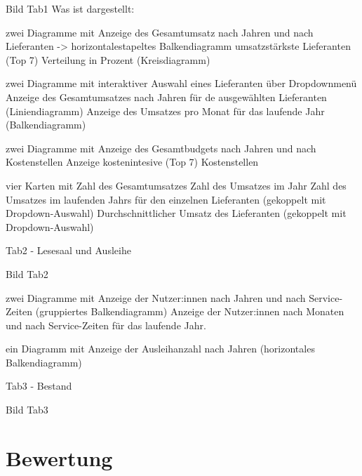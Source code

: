     Bild Tab1
    Was ist dargestellt:
    
    zwei Diagramme mit 
        Anzeige des Gesamtumsatz nach Jahren und nach Lieferanten ->  horizontalestapeltes Balkendiagramm
        umsatzstärkste Lieferanten (Top 7) Verteilung in Prozent (Kreisdiagramm)
        
    zwei Diagramme mit interaktiver Auswahl eines Lieferanten über Dropdownmenü
        Anzeige des Gesamtumsatzes nach Jahren für de ausgewählten Lieferanten (Liniendiagramm)
        Anzeige des Umsatzes pro Monat für das laufende Jahr (Balkendiagramm)
    
    zwei Diagramme mit
        Anzeige des Gesamtbudgets nach Jahren und nach Kostenstellen 
        Anzeige kostenintesive (Top 7) Kostenstellen
        
    
    vier Karten mit
        Zahl des Gesamtumsatzes
        Zahl des Umsatzes im Jahr
        Zahl des Umsatzes im laufenden Jahrs für den einzelnen Lieferanten (gekoppelt mit Dropdown-Auswahl)
        Durchschnittlicher Umsatz des Lieferanten (gekoppelt mit Dropdown-Auswahl)
    
    
    
    
    
    Tab2 - Lesesaal und Ausleihe
    
    Bild Tab2
    
    zwei Diagramme mit
        Anzeige der Nutzer:innen nach Jahren und nach Service-Zeiten (gruppiertes Balkendiagramm)
        Anzeige der Nutzer:innen nach Monaten und nach Service-Zeiten für das laufende Jahr.
        
     ein Diagramm mit
        Anzeige der Ausleihanzahl nach Jahren (horizontales Balkendiagramm)
    
    Tab3 - Bestand
    
    Bild Tab3

    
     



\section{Bewertung}

